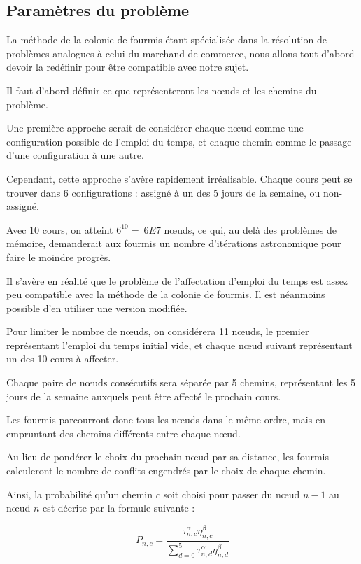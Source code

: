 
\subsection {Paramètres du problème}

La méthode de la colonie de fourmis étant spécialisée dans la résolution de problèmes analogues à celui du marchand de commerce, nous allons tout d'abord devoir la redéfinir pour être compatible avec notre sujet.

Il faut d'abord définir ce que représenteront les n\oe uds et les chemins du problème.

Une première approche serait de considérer chaque n\oe ud comme une configuration possible de l'emploi du temps, et chaque chemin comme le passage d'une configuration à une autre.

Cependant, cette approche s'avère rapidement irréalisable.
Chaque cours peut se trouver dans 6 configurations : assigné à un des 5 jours de la semaine, ou non-assigné.

Avec 10 cours, on atteint $6^{10} = ~6E7$ n\oe uds, ce qui, au delà des problèmes de mémoire, demanderait aux fourmis un nombre d'itérations astronomique pour faire le moindre progrès.

Il s'avère en réalité que le problème de l'affectation d'emploi du temps est assez peu compatible avec la méthode de la colonie de fourmis.
Il est néanmoins possible d'en utiliser une version modifiée.

Pour limiter le nombre de n\oe uds, on considérera 11 n\oe uds, le premier représentant l'emploi du temps initial vide, et chaque n\oe ud suivant représentant un des 10 cours à affecter.

Chaque paire de n\oe uds consécutifs sera séparée par 5 chemins, représentant les 5 jours de la semaine auxquels peut être affecté le prochain cours.

Les fourmis parcourront donc tous les n\oe uds dans le même ordre, mais en empruntant des chemins différents entre chaque n\oe ud.

Au lieu de pondérer le choix du prochain n\oe ud par sa distance, les fourmis calculeront le nombre de conflits engendrés par le choix de chaque chemin.

Ainsi, la probabilité qu'un chemin $c$ soit choisi pour passer du n\oe ud $n-1$ au n\oe ud $n$ est décrite par la formule suivante :

$$P_{n,c} = \frac{\tau^{\alpha}_{n,c}\eta^{\beta}_{n,c}}{\sum^{5}_{d = 0}{\tau^{\alpha}_{n,d}\eta^{\beta}_{n,d}}}$$

